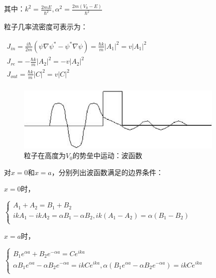 其中：$k^2  = \frac{{2mE}}{{\hbar ^2 }},\alpha ^2  = \frac{{2m\left( {V_0  - E} \right)}}{{\hbar ^2 }}$

粒子几率流密度可表示为：

\begin{center}
$\begin{array}{l}
 J_{in}  = \frac{{i\hbar }}{{2m}}\left( {\psi \nabla \psi ^*  - \psi ^* \nabla \psi } \right) = \frac{{\hbar k}}{m}\left| {A_1 } \right|^2  = v\left| {A_1 } \right|^2  \\
 J_{re}  =  - \frac{{\hbar k}}{m}\left| {A_2 } \right|^2  =  - v\left| {A_2 } \right|^2  \\
 J_{out}  = \frac{{\hbar k}}{m}\left| C \right|^2  = v\left| C \right|^2  \\
 \end{array}$
\end{center}

\begin{figure}[h]
\begin{center}
\includegraphics[clip,width=10cm]{1DProblem/11-4.ps}
\caption{粒子在高度为$V_0$的势垒中运动：波函数}
\end{center}
\end{figure}

对$x=0$和$x=a$，分别列出波函数满足的边界条件：

$x=0$时，

\begin{center}
$\left\{ \begin{array}{l}
 A_1  + A_2  = B_1  + B_2  \\
 ikA_1  - ikA_2  = \alpha B_1  - \alpha B_2 ,ik\left( {A_1  - A_2 } \right) = \alpha \left( {B_1  - B_2 } \right) \\
 \end{array} \right.$
\end{center}

$x=a$时，

\begin{center}
$\left\{ \begin{array}{l}
 B_1 e^{\alpha a}  + B_2 e^{ - \alpha a}  = Ce^{ika}  \\
 \alpha B_1 e^{\alpha a}  - \alpha B_2 e^{ - \alpha a}  = ikCe^{ika} ,\alpha \left( {B_1 e^{\alpha a}  - \alpha B_2 e^{ - \alpha a} } \right) = ikCe^{ika}  \\
 \end{array} \right.$
\end{center}

